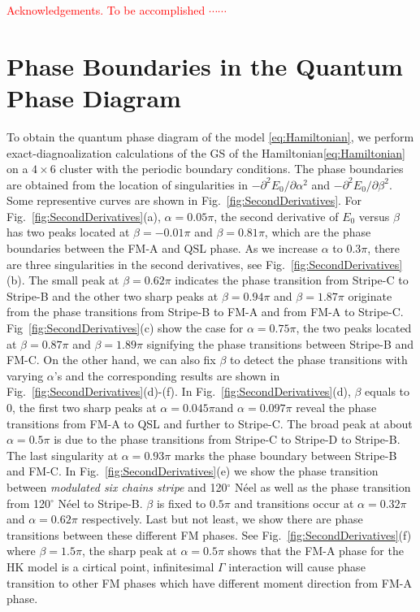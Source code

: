 \documentclass[aps,prb,reprint,amsfonts,amsmath,amssymb,showpacs,groupedaddress,superscriptaddress]{revtex4-1}
\begin{document}
\begin{acknowledgments}
    \textcolor{red}{Acknowledgements.  To be accomplished $\cdots \cdots$}
\end{acknowledgments}


\newpage
\appendix

\section{\label{apx:PhaseBoundary}Phase Boundaries in the Quantum Phase Diagram}

To obtain the quantum phase diagram of the model \eqref{eq:Hamiltonian}, we perform exact-diagnoalization calculations of the GS of the Hamiltonian\eqref{eq:Hamiltonian} on a $4 \times 6$ cluster with the periodic boundary conditions. The phase boundaries are obtained from the location of singularities in $-\partial^2E_0/\partial\alpha^2$ and $-\partial^2E_0/\partial\beta^2$. Some representive curves are shown in Fig.~\ref{fig:SecondDerivatives}. For Fig.~\ref{fig:SecondDerivatives}(a), $\alpha=0.05\pi$, the second derivative of $E_0$ versus $\beta$ has two peaks located at $\beta=-0.01\pi$ and $\beta=0.81\pi$, which are the phase boundaries between the FM-A and QSL phase. As we increase $\alpha$ to $0.3\pi$, there are three singularities in the second derivatives, see Fig.~\ref{fig:SecondDerivatives}(b). The small peak at $\beta=0.62\pi$ indicates the phase transition from Stripe-C to Stripe-B and the other two sharp peaks at $\beta=0.94\pi$ and $\beta=1.87\pi$ originate from the phase transitions from Stripe-B to FM-A and from FM-A to Stripe-C. Fig~\ref{fig:SecondDerivatives}(c) show the case for $\alpha=0.75\pi$, the two peaks located at $\beta=0.87\pi$ and $\beta=1.89\pi$ signifying the phase transitions between Stripe-B and FM-C. On the other hand, we can also fix $\beta$ to detect the phase transitions with varying $\alpha$'s and the corresponding results are shown in Fig.~\ref{fig:SecondDerivatives}(d)-(f). In Fig.~\ref{fig:SecondDerivatives}(d), $\beta$ equals to $0$, the first two sharp peaks at $\alpha=0.045\pi$and $\alpha=0.097\pi$ reveal the phase transitions from FM-A to QSL and further to Stripe-C. The broad peak at about $\alpha=0.5\pi$ is due to the phase transitions from Stripe-C to Stripe-D to Stripe-B. The last singularity at $\alpha=0.93\pi$ marks the phase boundary between Stripe-B and FM-C. In Fig.~\ref{fig:SecondDerivatives}(e) we show the phase transition between \emph{modulated six chains stripe} and 120$^\circ$ N\'{e}el as well as the phase transition from 120$^\circ$ N\'{e}el to Stripe-B. $\beta$ is fixed to $0.5\pi$ and transitions occur at $\alpha=0.32\pi$ and $\alpha=0.62\pi$ respectively. Last but not least, we show there are phase transitions between these different FM phases. See Fig.~\ref{fig:SecondDerivatives}(f) where $\beta=1.5\pi$, the sharp peak at $\alpha=0.5\pi$ shows that the FM-A phase for the HK model is a cirtical point, infinitesimal $\Gamma$ interaction will cause phase transition to other FM phases which have different moment direction from FM-A phase.
\end{document}

